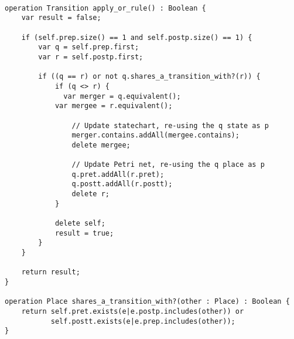 
\tt
\begin{lstlisting}
operation Transition apply_or_rule() : Boolean {
	var result = false;
	
	if (self.prep.size() == 1 and self.postp.size() == 1) {
		var q = self.prep.first;
		var r = self.postp.first;
	
		if ((q == r) or not q.shares_a_transition_with?(r)) {		
			if (q <> r) {
			  var merger = q.equivalent();
  			var mergee = r.equivalent();
  			
				// Update statechart, re-using the q state as p
				merger.contains.addAll(mergee.contains);	
				delete mergee;
				
				// Update Petri net, re-using the q place as p
				q.pret.addAll(r.pret);
				q.postt.addAll(r.postt);
				delete r;
			}
			
			delete self;
			result = true;
		}
	}

	return result;
}

operation Place shares_a_transition_with?(other : Place) : Boolean {
	return self.pret.exists(e|e.postp.includes(other)) or 
	       self.postt.exists(e|e.prep.includes(other));
}

\end{lstlisting}